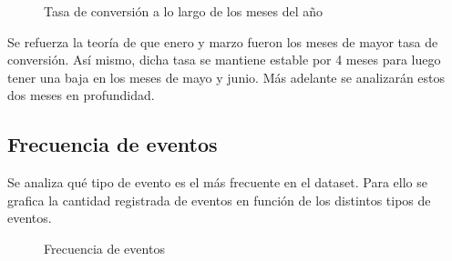\documentclass[a4paper]{article}
\begin{document}
\begin{figure}[h!]
	\caption{Tasa de conversión a lo largo de los meses del año}
	\label{fig:conversionratemonthly}
\end{figure}

Se refuerza la teoría de que enero y marzo fueron los meses de mayor tasa de conversión. Así mismo, dicha tasa se mantiene estable por 4 meses para luego tener una baja en los meses de mayo y junio. Más adelante se analizarán estos dos meses en profundidad.

\subsection{Frecuencia de eventos}

Se analiza qué tipo de evento es el más frecuente en el dataset. Para ello se grafica la cantidad registrada de eventos en función de los distintos tipos de eventos.

\begin{figure}[h!]
	\caption{Frecuencia de eventos}
	\label{fig:freqeventos}
\end{figure}
\end{document}
